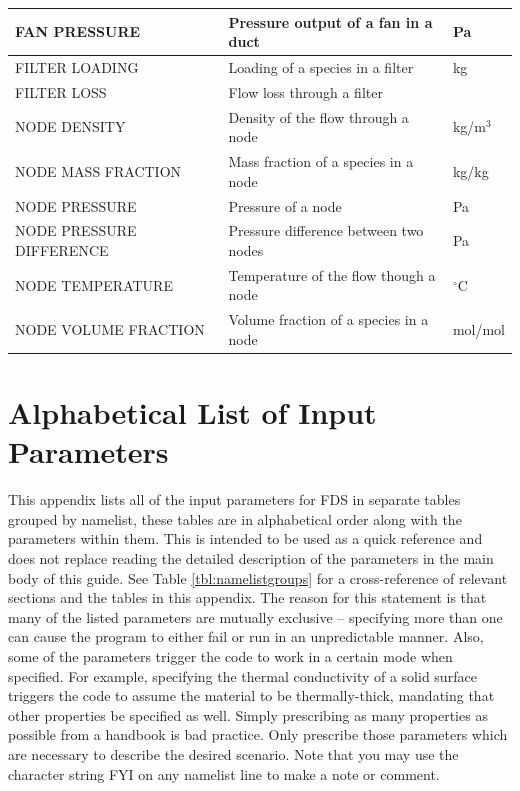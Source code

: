 \documentclass[11pt]{book}
\begin{document}
\begin{longtable}{|l|l|l|@{\extracolsep{\fill}}}
{\ct FAN PRESSURE}                              & Pressure output of a fan in a duct        &  Pa                   \\ \hline
{\ct FILTER LOADING}                            & Loading of a species in a filter          &  kg                   \\ \hline
{\ct FILTER LOSS}                               & Flow loss through a filter                &                       \\ \hline
{\ct NODE DENSITY}                              & Density of the flow through a node        &  kg/m$^3$             \\ \hline
{\ct NODE MASS FRACTION}                        & Mass fraction of a species in a node      &  kg/kg                \\ \hline
{\ct NODE PRESSURE}                             & Pressure of a node                        &       Pa              \\ \hline
{\ct NODE PRESSURE DIFFERENCE}                  & Pressure difference between two nodes     &       Pa              \\ \hline
{\ct NODE TEMPERATURE}                          & Temperature of the flow though a node     & $^\circ$C             \\ \hline
{\ct NODE VOLUME FRACTION}                      & Volume fraction of a species in a node    &  mol/mol              \\ \hline
\end{longtable}



\chapter{Alphabetical List of Input Parameters}

This appendix lists all of the input parameters for FDS in separate tables grouped by namelist, these tables are in alphabetical order along with the parameters within them. This is intended to be used as a quick reference and does not replace reading the detailed description of the parameters in the main body of this guide. See Table \ref{tbl:namelistgroups} for a cross-reference of relevant sections and the tables in this appendix. The reason for this statement is that many of the listed parameters are mutually exclusive -- specifying more than one can cause the program to either fail or run in an unpredictable manner. Also, some of the parameters trigger the code to work in a certain mode when specified. For example, specifying the thermal conductivity of a solid surface triggers the code to assume the material to be thermally-thick, mandating that other
properties be specified as well. Simply prescribing as many properties as possible from a handbook is bad practice. Only prescribe those parameters which are necessary to describe the desired scenario. Note that you may use the character string {\ct FYI} on any namelist line to make a note or comment.
\end{document}
